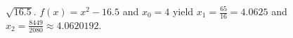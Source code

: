 {$\sqrt{16.5}$.}
{$f(x)=x^2-16.5$ and $x_0=4$ yield $x_1=\frac{65}{16}=4.0625$ and $x_2=\frac{8449}{2080}\approx4.0620192$.}
